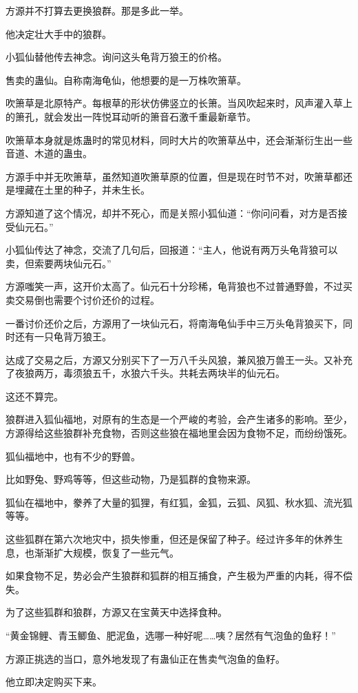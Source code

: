 \begin{this_body}
方源并不打算去更换狼群。那是多此一举。

他决定壮大手中的狼群。

小狐仙替他传去神念。询问这头龟背万狼王的价格。

售卖的蛊仙。自称南海龟仙，他想要的是一万株吹箫草。

吹箫草是北原特产。每根草的形状仿佛竖立的长箫。当风吹起来时，风声灌入草上的箫孔，就会发出一阵悦耳动听的箫音石激千重最新章节。

吹箫草本身就是炼蛊时的常见材料，同时大片的吹箫草丛中，还会渐渐衍生出一些音道、木道的蛊虫。

方源手中并无吹箫草，虽然知道吹箫草原的位置，但是现在时节不对，吹箫草都还是埋藏在土里的种子，并未生长。

方源知道了这个情况，却并不死心，而是关照小狐仙道：“你问问看，对方是否接受仙元石。”

小狐仙传达了神念，交流了几句后，回报道：“主人，他说有两万头龟背狼可以卖，但索要两块仙元石。”

方源嗤笑一声，这开价太高了。仙元石十分珍稀，龟背狼也不过普通野兽，不过买卖交易倒也需要个讨价还价的过程。

一番讨价还价之后，方源用了一块仙元石，将南海龟仙手中三万头龟背狼买下，同时还有一只龟背万狼王。

达成了交易之后，方源又分别买下了一万八千头风狼，兼风狼万兽王一头。又补充了夜狼两万，毒须狼五千，水狼六千头。共耗去两块半的仙元石。

这还不算完。

狼群进入狐仙福地，对原有的生态是一个严峻的考验，会产生诸多的影响。至少，方源得给这些狼群补充食物，否则这些狼在福地里会因为食物不足，而纷纷饿死。

狐仙福地中，也有不少的野兽。

比如野兔、野鸡等等，但这些动物，乃是狐群的食物来源。

狐仙在福地中，豢养了大量的狐狸，有红狐，金狐，云狐、风狐、秋水狐、流光狐等等。

这些狐群在第六次地灾中，损失惨重，但还是保留了种子。经过许多年的休养生息，也渐渐扩大规模，恢复了一些元气。

如果食物不足，势必会产生狼群和狐群的相互捕食，产生极为严重的内耗，得不偿失。

为了这些狐群和狼群，方源又在宝黄天中选择食种。

“黄金锦鲤、青玉鲫鱼、肥泥鱼，选哪一种好呢……咦？居然有气泡鱼的鱼籽！”

方源正挑选的当口，意外地发现了有蛊仙正在售卖气泡鱼的鱼籽。

他立即决定购买下来。


\end{this_body}
